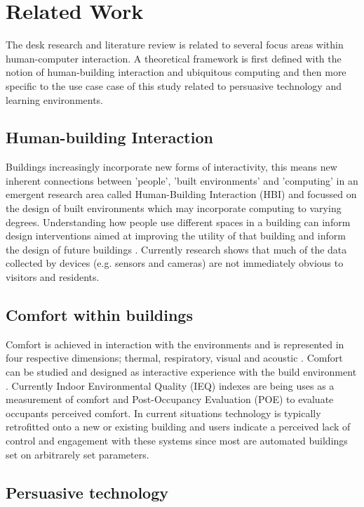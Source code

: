 \section{Related Work}

The desk research and literature review is related to several focus areas within human-computer interaction. A theoretical framework is first defined with the notion of human-building interaction and ubiquitous computing and then more specific to the use case case of this study related to persuasive technology and learning environments.

\subsection{Human-building Interaction}
Buildings increasingly incorporate new forms of interactivity, this means new inherent connections between 'people', 'built environments' and 'computing' in an emergent research area called Human-Building Interaction (HBI) \cite{hbi} and focussed on the design of built environments which may incorporate computing to varying degrees. Understanding how people use different spaces in a building can inform design interventions aimed at improving the utility of that building and inform the design of future buildings \cite{informed}. Currently research shows that much of the data collected by devices (e.g. sensors and cameras) are not immediately obvious to visitors and residents.

\subsection{Comfort within buildings}

Comfort is achieved in interaction with the environments and is represented in four respective dimensions; thermal, respiratory, visual and acoustic \cite{comfort}. Comfort can be studied and designed as interactive experience with the build environment \cite{environment}. Currently Indoor Environmental Quality (IEQ) indexes are being uses as a measurement of comfort and Post-Occupancy Evaluation (POE) to evaluate occupants perceived comfort. In current situations technology is typically retrofitted onto a new or existing building and users indicate a perceived lack of control and engagement with these systems since most are automated buildings set on arbitrarely set parameters. 

\subsection{Persuasive technology}

